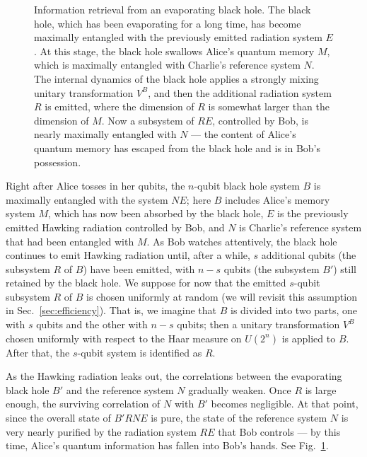 \documentclass[11pt]{article}
\begin{document}
\begin{figure}
\begin{center}
\leavevmode
\epsfxsize=3.5in
\end{center}
\caption{Information retrieval from an evaporating black hole. The black hole, which has been evaporating for a long time, has become maximally entangled with the previously emitted radiation system $E$. At this stage, the black hole swallows Alice's quantum memory $M$, which is maximally entangled with Charlie's reference system $N$. The internal dynamics of the black hole applies a strongly mixing unitary transformation $V^B$, and then the additional radiation system $R$ is emitted, where the dimension of $R$ is somewhat larger than the dimension of $M$. Now a subsystem of $RE$, controlled by Bob, is nearly maximally entangled with $N$ --- the content of Alice's quantum memory has escaped from the black hole and is in Bob's possession.}
\label{fig:retrieval}
\end{figure}

Right after Alice tosses in her qubits, the $n$-qubit black hole system $B$ is maximally entangled with the system $NE$; here $B$ includes Alice's memory system $M$, which has now been absorbed by the black hole,  $E$ is the previously emitted Hawking radiation controlled by Bob, and $N$ is Charlie's reference system that had been entangled with $M$. As Bob watches attentively, the black hole continues to emit Hawking radiation until, after a while, $s$ additional qubits (the subsystem $R$ of $B$) have been emitted, with $n-s$ qubits (the subsystem $B'$) still retained by the black hole. We suppose for now that the emitted $s$-qubit subsystem $R$ of $B$ is chosen uniformly at random (we will revisit this assumption in Sec.~\ref{sec:efficiency}). That is, we imagine that  $B$ is divided into two parts, one with $s$ qubits and the other with $n-s$ qubits; then a unitary transformation $V^B$ chosen uniformly with respect to the Haar measure on $U(2^n)$ is applied to $B$. After that, the $s$-qubit system is identified as $R$.

As the Hawking radiation leaks out, the correlations between the evaporating black hole $B'$ and the reference system $N$ gradually weaken. Once $R$ is large enough, the surviving correlation of $N$ with $B'$ becomes negligible. At that point, since the overall state of $B'RNE$ is pure, the state of the reference system $N$ is very nearly purified by the radiation system $RE$ that Bob controls --- by this time, Alice's quantum information has fallen into Bob's hands. See Fig.~\ref{fig:retrieval}.
\end{document}
